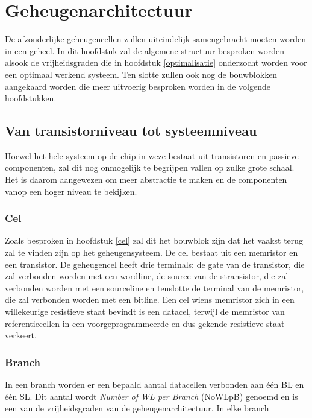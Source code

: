 \chapter{Geheugenarchitectuur}
\label{architectuur}
De afzonderlijke geheugencellen zullen uiteindelijk samengebracht moeten worden in een geheel.
In dit hoofdstuk zal de algemene structuur besproken worden alsook de vrijheidsgraden die in hoofdstuk \ref{optimalisatie} onderzocht worden voor een optimaal werkend systeem. Ten slotte zullen ook nog de bouwblokken aangekaard worden die meer uitvoerig besproken worden in de volgende hoofdstukken. 

\section{Van transistorniveau tot systeemniveau}
Hoewel het hele systeem op de chip in weze bestaat uit transistoren en passieve componenten, zal dit nog onmogelijk te begrijpen vallen op zulke grote schaal.
Het is daarom aangewezen om meer abstractie te maken en de componenten vanop een hoger niveau te bekijken.

\subsection{Cel}
Zoals besproken in hoofdstuk \ref{cel} zal dit het bouwblok zijn dat het vaakst terug zal te vinden zijn op het geheugensysteem.
De cel bestaat uit een memristor en een transistor. De geheugencel heeft drie terminals: de gate van de transistor, die zal verbonden worden met een wordline, de source van de stransistor, die zal verbonden worden met een sourceline en tenslotte de terminal van de memristor, die zal verbonden worden met een bitline.
Een cel wiens memristor zich in een willekeurige resistieve staat bevindt is een datacel, terwijl de memristor van referentiecellen in een voorgeprogrammeerde en dus gekende resistieve staat verkeert.

\subsection{Branch}
In een branch worden er een bepaald aantal datacellen verbonden aan één BL en één SL. Dit aantal wordt \emph{Number of WL per Branch} (NoWLpB) genoemd en is een van de vrijheidsgraden van de geheugenarchitectuur. In elke branch 

